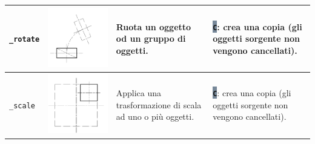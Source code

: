 \documentclass[..]{../IEEEphot}
\newcommand{\param}[1]{\colorbox{LightSlateGray}{\color{Navy}\texttt{\textbf{#1}}}}
\begin{document}
\begin{center}
\begin{longtable}{m{.2\linewidth}m{.2\linewidth}m{.25\linewidth}m{.25\linewidth}}
\texttt{\_rotate} & \includegraphics[width = 0.8\linewidth, keepaspectratio]{../images/jpg/_rotate.jpg} & Ruota un oggetto od un gruppo di oggetti. & 
\param{C}: crea una copia (gli oggetti sorgente non vengono cancellati).
\\	
\midrule
\texttt{\_scale} & \includegraphics[width = 0.8\linewidth, keepaspectratio]{../images/jpg/_scale.jpg} & Applica una trasformazione di scala ad uno o più oggetti. & 
\param{C}: crea una copia (gli oggetti sorgente non vengono cancellati).
\\	
\midrule

\end{longtable}
\end{center}
\end{document}
